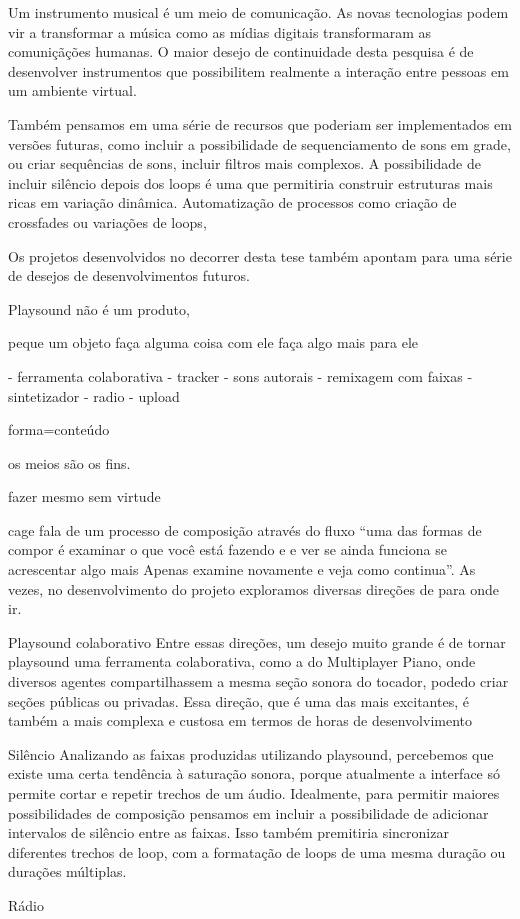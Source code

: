 Um instrumento musical é um meio de comunicação. As novas tecnologias podem vir a transformar a música como as mídias digitais transformaram as comuniçãções humanas. O maior desejo de continuidade desta pesquisa é de desenvolver instrumentos que possibilitem realmente a interação entre pessoas em um ambiente virtual. 

Também pensamos em uma série de recursos que poderiam ser implementados em versões futuras, como incluir a possibilidade de sequenciamento de sons em grade, ou criar sequências de sons, incluir filtros mais complexos. A possibilidade de incluir silêncio depois dos loops é uma que permitiria construir estruturas mais ricas em variação dinâmica. Automatização de processos como criação de crossfades ou variações de loops, 






Os projetos desenvolvidos no decorrer desta tese também apontam para uma série de desejos de desenvolvimentos futuros. 



Playsound não é um produto,

peque um objeto
faça alguma coisa com ele
faça algo mais para ele

\cite[71]{Cage2015} 

- ferramenta colaborativa
- tracker
- sons autorais
- remixagem com faixas 
- sintetizador
- radio
- upload


forma=conteúdo

os meios são os fins.

fazer mesmo sem virtude


cage fala de um processo de composição através do fluxo ``uma das formas de compor é examinar o que você está fazendo e e ver se ainda funciona se acrescentar algo mais Apenas examine novamente e veja como continua''\cite{Cage2015}. As vezes, no desenvolvimento do projeto exploramos diversas direções de para onde ir. 

Playsound colaborativo
Entre essas direções, um desejo muito grande é de tornar playsound uma ferramenta colaborativa, como a do Multiplayer Piano, onde diversos agentes compartilhassem a mesma seção sonora do tocador, podedo criar seções públicas ou privadas.
Essa direção, que é uma das mais excitantes, é também a mais complexa e custosa em termos de horas de desenvolvimento


Silêncio
Analizando as faixas produzidas utilizando playsound, percebemos que existe uma certa tendência à saturação sonora, porque atualmente a interface só permite cortar e repetir trechos de um áudio. Idealmente, para permitir maiores possibilidades de composição pensamos em incluir a possibilidade de adicionar intervalos de silêncio entre as faixas. Isso também premitiria sincronizar diferentes trechos de loop, com a formatação de loops de uma mesma duração ou durações múltiplas. 

Rádio


